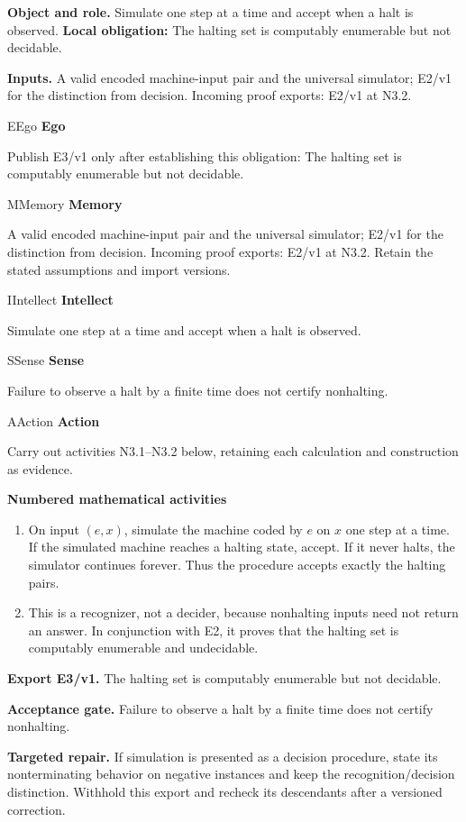 \documentclass[preprint,12pt,aps,pra,showkeys,amsmath,amssymb,superscriptaddress,floatfix]{revtex4-2}
\theoremstyle{definition}
\theoremstyle{remark}
\newcommand{\mmfaculty}[3]{%
 \begin{mmfacultybox}{#1}{#2}
 {\sffamily\bfseries\color{MMBlue}#2}\par\smallskip #3
 \end{mmfacultybox}}
\newcommand{\field}[2]{\par\smallskip\noindent\textbf{#1.} #2\par}
\begin{document}
\field{Object and role}{Simulate one step at a time and accept when a halt is observed.
\textbf{Local obligation:} The halting set is computably enumerable but
not decidable.}

\field{Inputs}{A valid encoded machine-input pair and the universal simulator; E2/v1
for the distinction from decision. Incoming proof exports: E2/v1 at
N3.2.}

\mmfaculty{E}{Ego}{Publish E3/v1 only after establishing this obligation: The halting set
is computably enumerable but not decidable.}

\mmfaculty{M}{Memory}{A valid encoded machine-input pair and the universal simulator; E2/v1
for the distinction from decision. Incoming proof exports: E2/v1 at
N3.2. Retain the stated assumptions and import versions.}

\mmfaculty{I}{Intellect}{Simulate one step at a time and accept when a halt is observed.}

\mmfaculty{S}{Sense}{Failure to observe a halt by a finite time does not certify nonhalting.}

\mmfaculty{A}{Action}{Carry out activities N3.1--N3.2 below, retaining each calculation and
construction as evidence.}

\smallskip\noindent\textbf{Numbered mathematical activities}

\begin{enumerate}[label=N3.\arabic*,leftmargin=3.4em]

\item On input \((e,x)\), simulate the machine coded by \(e\) on \(x\) one
step at a time. If the simulated machine reaches a halting state,
accept. If it never halts, the simulator continues forever. Thus the
procedure accepts exactly the halting pairs.

\item This is a recognizer, not a decider, because nonhalting inputs need not
return an answer. In conjunction with E2, it proves that the halting set
is computably enumerable and undecidable.

\end{enumerate}

\field{Export E3/v1}{The halting set is computably enumerable but not decidable.}

\field{Acceptance gate}{Failure to observe a halt by a finite time does not certify nonhalting.}

\field{Targeted repair}{If simulation is presented as a decision procedure, state its
nonterminating behavior on negative instances and keep the
recognition/decision distinction. Withhold this export and recheck its
descendants after a versioned correction.}
\end{document}
